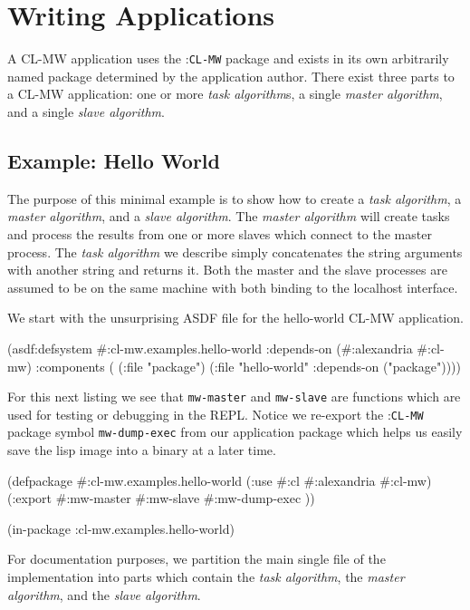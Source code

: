 \documentclass[titlepage,12pt]{book}
\newcommand{\xsmall}{\latexhtml{\small}{}}
\newcommand{\xnormalsize}{\latexhtml{\normalsize}{}}
\newcommand{\clmw}{\xsmall\textsc{CL-MW}\xnormalsize\xspace}
\newcommand{\package}[1]{\mbox{:\uppercase{\xsmall\texttt{#1}\xnormalsize}} package\xspace}
\newcommand{\mwpackage}{\package{CL-MW}}
\newcommand{\sa}{\textit{slave algorithm}\xspace}
\newcommand{\ma}{\textit{master algorithm}\xspace}
\newcommand{\ta}{\textit{task algorithm}\xspace}
\newcommand{\tas}{\textit{task algorithm}s\xspace}
\newcommand{\func}[1]{\mbox{\texttt{#1}}\xspace}
\newcommand{\file}[1]{\texttt{#1}\xspace}
\begin{document}
\chapter{Writing Applications}

A \clmw application uses the \mwpackage and exists in its own
arbitrarily named package determined by the application author.
There exist three parts to a \clmw application: one or more \tas,
a single \ma, and a single \sa.

\section{Example: Hello World}

The purpose of this minimal example is to show how to create a \ta,
a \ma, and a \sa. The \ma will create tasks and process the results
from one or more slaves which connect to the master process. The \ta we
describe simply concatenates the string arguments with another string
and returns it. Both the master and the slave processes are assumed
to be on the same machine with both binding to the localhost interface.

We start with the unsurprising ASDF file for the hello-world \clmw application.

\begin{lisp}[caption=\file{cl-mw.examples.hello-world.asd}]
(asdf:defsystem #:cl-mw.examples.hello-world
  :depends-on (#:alexandria #:cl-mw)
  :components ( (:file "package")
                (:file "hello-world"
                       :depends-on ("package"))))
\end{lisp}

For this next listing we see that \func{mw-master} and \func{mw-slave}
are functions which are used for testing or debugging in the
REPL. Notice we re-export the \mwpackage symbol \func{mw-dump-exec}
from our application package which helps us easily save the lisp image
into a binary at a later time.

\begin{lisp}[caption=\file{package.lisp}]
(defpackage #:cl-mw.examples.hello-world
  (:use #:cl #:alexandria #:cl-mw)
  (:export #:mw-master
           #:mw-slave
           #:mw-dump-exec ))

(in-package :cl-mw.examples.hello-world)
\end{lisp}

For documentation purposes, we partition the main single file of the
implementation into parts which contain the \ta, the \ma, and the \sa.
\end{document}
